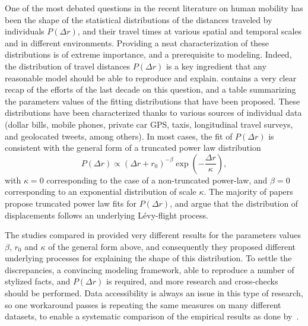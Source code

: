 One of the most debated questions in the recent literature on human
mobility has been the shape of the statistical distributions of 
the distances traveled by individuals $P(\Delta r)$, and their
travel times at various spatial and temporal scales and in different
environments. Providing a neat characterization of these
distributions is of extreme importance, and a prerequisite to
modeling. Indeed, the distribution of travel distances $P(\Delta r)$
is a key ingredient that any reasonable model should be able to
reproduce and explain. \cite{gallotti_2015_stochastic} contains a very clear
recap of the efforts of the last decade on this question, and a table
summarizing the parameters values of the fitting distributions that have
been proposed. These distributions have been characterized thanks to
various sources of individual data (dollar bills, mobile phones,
private car GPS, taxis, longitudinal travel surveys, and geolocated
tweets, among others). In most cases, the fit of $P(\Delta r)$ is
consistent with the general form of a truncated power law distribution
\begin{equation}
P(\Delta r) \propto (\Delta r + r_0)^{-\beta} \exp\left(-\frac{\Delta r}{\kappa}\right),
\end{equation}
with $\kappa = 0$ corresponding to the case of a non-truncated
power-law, and $\beta = 0$ corresponding to an exponential
distribution of scale $\kappa$. The majority of papers propose truncated power law fits for $P(\Delta r)$, and
argue that the distribution of displacements follows an underlying L\'evy-flight process.


The studies compared in \cite{gallotti_2015_stochastic} provided very different
results for the parameters values $\beta$, $r_0$ and $\kappa$ of the
general form above, and consequently they proposed different
underlying processes for explaining the shape of this
distribution. To settle the discrepancies, a convincing modeling
framework, able to reproduce a number of stylized facts, and $P(\Delta
r)$ is required, and more research
and cross-checks should be performed. Data accessibility is always an issue in this type of research, so one workaround passes is repeating the same measures on many different datasets, to enable a systematic comparison of the
empirical results as done by~\cite{gallotti_2015_stochastic}.


